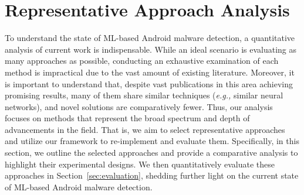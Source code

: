 \vspace{-0.1cm}
\section{Representative Approach Analysis}
\label{sec:approach_analysis}






To understand the state of ML-based Android malware detection, a quantitative analysis of current work is indispensable.
While an ideal scenario is evaluating as many approaches as possible, conducting an exhaustive examination of each method is impractical due to the vast amount of existing literature.
Moreover, it is important to understand that, despite vast publications in this area achieving promising results, many of them share similar techniques (\textit{e.g.,} similar neural networks), and novel solutions are comparatively fewer.
Thus, our analysis focuses on methods that represent the broad spectrum and depth of advancements in the field.
That is, we aim to select representative approaches and utilize our framework to re-implement and evaluate them.
Specifically, in this section, we outline the selected approaches and provide a comparative analysis to highlight their experimental designs.
We then quantitatively evaluate these approaches in Section~\ref{sec:evaluation}, shedding further light on the current state of ML-based Android malware detection.

